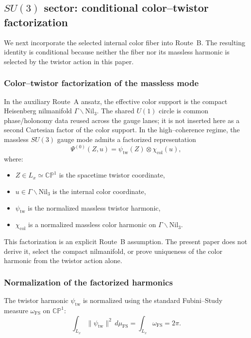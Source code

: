 \documentclass[11pt]{article}
\begin{document}
\subsection{\texorpdfstring{$SU(3)$}{SU(3)} sector:
conditional color--twistor factorization}

We next incorporate the selected internal color fiber into Route~B. The
resulting identity is conditional because neither the fiber nor its massless
harmonic is selected by the twistor action in this paper.

\subsubsection{Color--twistor factorization of the massless mode}

In the auxiliary Route~A ansatz, the effective color support is the compact
Heisenberg nilmanifold $\Gamma\backslash\mathrm{Nil}_3$. The shared $U(1)$
circle is common phase/holonomy data reused across the gauge lanes; it is not
inserted here as a second Cartesian factor of the color support.
In the high--coherence regime, the massless $SU(3)$ gauge mode admits a
factorized representation
\begin{equation}
\Psi^{(0)}(Z,u)
=
\psi_{\mathrm{tw}}(Z)\otimes \chi_{\mathrm{col}}(u),
\label{eq:color_twistor_factorization}
\end{equation}
where:
\begin{itemize}
\item $Z\in L_x\simeq\mathbb{CP}^1$ is the spacetime twistor coordinate,
\item $u\in \Gamma\backslash\mathrm{Nil}_3$ is the internal color coordinate,
\item $\psi_{\mathrm{tw}}$ is the normalized massless twistor harmonic,
\item $\chi_{\mathrm{col}}$ is a normalized massless color harmonic on
$\Gamma\backslash\mathrm{Nil}_3$.
\end{itemize}

This factorization is an explicit Route~B assumption. The present paper does
not derive it, select the compact nilmanifold, or prove uniqueness of the color
harmonic from the twistor action alone.

\subsubsection{Normalization of the factorized harmonics}

The twistor harmonic $\psi_{\mathrm{tw}}$ is normalized using the standard
Fubini--Study measure $\omega_{\mathrm{FS}}$ on $\mathbb{CP}^1$:
\begin{equation}
\int_{L_x} \|\psi_{\mathrm{tw}}\|^2\, d\mu_{\mathrm{FS}}
=
\int_{L_x} \omega_{\mathrm{FS}}
=
2\pi.
\label{eq:SU3_twistor_norm}
\end{equation}
\end{document}
